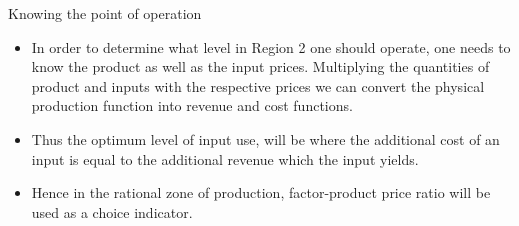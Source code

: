 \documentclass[12pt,ignorenonframetext,aspectratio=169]{beamer}
\providecommand{\tightlist}{%
  \setlength{\itemsep}{0pt}\setlength{\parskip}{0pt}}
\begin{document}
\begin{frame}{Knowing the point of operation}
\protect\hypertarget{knowing-the-point-of-operation}{}
\begin{itemize}
\tightlist
\item
  In order to determine what level in Region 2 one should operate, one
  needs to know the product as well as the input prices. Multiplying the
  quantities of product and inputs with the respective prices we can
  convert the physical production function into revenue and cost
  functions.
\item
  Thus the optimum level of input use, will be where the additional cost
  of an input is equal to the additional revenue which the input yields.
\item
  Hence in the rational zone of production, factor-product price ratio
  will be used as a choice indicator.
\end{itemize}
\end{frame}
\end{document}
